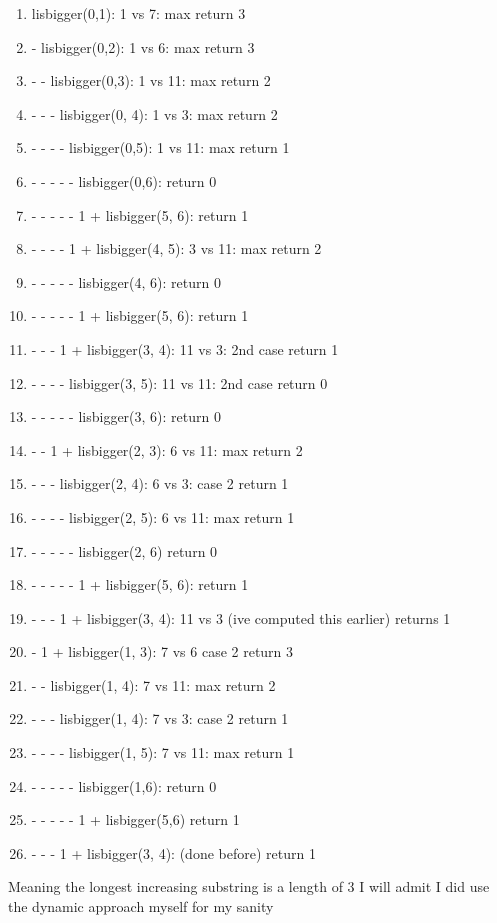 \documentclass{article}
\begin{document}
\begin{enumerate}
	\item lisbigger(0,1): 1 vs 7: max return 3
	\item - lisbigger(0,2): 1 vs 6: max return 3
	\item - - lisbigger(0,3): 1 vs 11: max return 2
	\item - - - lisbigger(0, 4): 1 vs 3: max return 2
	\item - - - - lisbigger(0,5): 1 vs 11: max return 1
	\item - - - - - lisbigger(0,6): return 0
	\item - - - - - 1 + lisbigger(5, 6): return 1
	\item - - - - 1 + lisbigger(4, 5): 3 vs 11: max return 2
	\item - - - - - lisbigger(4, 6): return 0
	\item - - - - - 1 + lisbigger(5, 6): return 1
	\item - - - 1 + lisbigger(3, 4): 11 vs 3: 2nd case return 1
	\item - - - - lisbigger(3, 5): 11 vs 11: 2nd case return 0
	\item - - - - - lisbigger(3, 6): return 0
	\item - - 1 + lisbigger(2, 3): 6 vs 11: max return 2
	\item - - - lisbigger(2, 4): 6 vs 3: case 2 return 1
	\item - - - - lisbigger(2, 5): 6 vs 11: max return 1
	\item - - - - - lisbigger(2, 6) return 0
	\item - - - - - 1 + lisbigger(5, 6): return 1
	\item - - - 1 + lisbigger(3, 4): 11 vs 3 (ive computed this earlier) returns 1
	\item - 1 + lisbigger(1, 3): 7 vs 6 case 2 return 3
	\item - - lisbigger(1, 4): 7 vs 11: max return 2
	\item - - - lisbigger(1, 4): 7 vs 3: case 2 return 1
	\item - - - - lisbigger(1, 5): 7 vs 11: max return 1
	\item - - - - - lisbigger(1,6): return 0
	\item - - - - - 1 + lisbigger(5,6) return 1
	\item - - - 1 + lisbigger(3, 4): (done before) return 1

\end{enumerate}
Meaning the longest increasing substring is a length of 3
I will admit I did use the dynamic approach myself for my sanity
\end{document}
